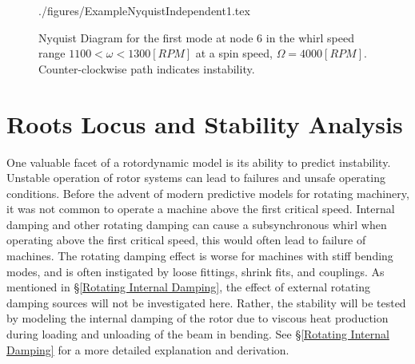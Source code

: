 \begin{figure}
	\def\width{.4\linewidth}
	\def\sep{2.5cm}
	\centering
	{./figures/ExampleNyquistIndependent1.tex}
	\caption{Nyquist Diagram for the first mode at node 6 in the whirl speed range $ 1100 < \omega < 1300[RPM] $ at a spin speed, $ \Omega=4000[RPM] $. Counter-clockwise path indicates instability.}
\end{figure}
\section{Roots Locus and Stability Analysis}
One valuable facet of a rotordynamic model is its ability to predict instability. Unstable operation of rotor systems can lead to failures and unsafe operating conditions. Before the advent of modern predictive models for rotating machinery, it was not common to operate a machine above the first critical speed. Internal damping and other rotating damping can cause a subsynchronous whirl when operating above the first critical speed, this would often lead to failure of machines. The rotating damping effect is worse for machines with stiff bending modes, and is often instigated by loose fittings, shrink fits, and couplings. As mentioned in \S\ref{Rotating Internal Damping}, the effect of external rotating damping sources will not be investigated here. Rather, the stability will be tested by modeling the internal damping of the rotor due to viscous heat production during loading and unloading of the beam in bending. See \S\ref{Rotating Internal Damping} for a more detailed explanation and derivation.\par 
